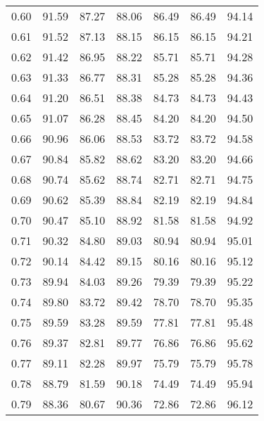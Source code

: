 \begin{tabular}{|c|c|c|c|c|c|c|}
      0.60 &     91.59 &     87.27 &      88.06 &   86.49 &      86.49 &         94.14 \\
      0.61 &     91.52 &     87.13 &      88.15 &   86.15 &      86.15 &         94.21 \\
      0.62 &     91.42 &     86.95 &      88.22 &   85.71 &      85.71 &         94.28 \\
      0.63 &     91.33 &     86.77 &      88.31 &   85.28 &      85.28 &         94.36 \\
      0.64 &     91.20 &     86.51 &      88.38 &   84.73 &      84.73 &         94.43 \\
      0.65 &     91.07 &     86.28 &      88.45 &   84.20 &      84.20 &         94.50 \\
      0.66 &     90.96 &     86.06 &      88.53 &   83.72 &      83.72 &         94.58 \\
      0.67 &     90.84 &     85.82 &      88.62 &   83.20 &      83.20 &         94.66 \\
      0.68 &     90.74 &     85.62 &      88.74 &   82.71 &      82.71 &         94.75 \\
      0.69 &     90.62 &     85.39 &      88.84 &   82.19 &      82.19 &         94.84 \\
      0.70 &     90.47 &     85.10 &      88.92 &   81.58 &      81.58 &         94.92 \\
      0.71 &     90.32 &     84.80 &      89.03 &   80.94 &      80.94 &         95.01 \\
      0.72 &     90.14 &     84.42 &      89.15 &   80.16 &      80.16 &         95.12 \\
      0.73 &     89.94 &     84.03 &      89.26 &   79.39 &      79.39 &         95.22 \\
      0.74 &     89.80 &     83.72 &      89.42 &   78.70 &      78.70 &         95.35 \\
      0.75 &     89.59 &     83.28 &      89.59 &   77.81 &      77.81 &         95.48 \\
      0.76 &     89.37 &     82.81 &      89.77 &   76.86 &      76.86 &         95.62 \\
      0.77 &     89.11 &     82.28 &      89.97 &   75.79 &      75.79 &         95.78 \\
      0.78 &     88.79 &     81.59 &      90.18 &   74.49 &      74.49 &         95.94 \\
      0.79 &     88.36 &     80.67 &      90.36 &   72.86 &      72.86 &         96.12 \\

\end{tabular}

